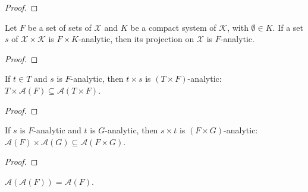 \begin{proof}\leanok

\end{proof}


\begin{lemma}\label{lem:IsPavingAnalytic.fst}
  \leanok
Let $F$ be a set of sets of $\mathcal{X}$ and $K$ be a compact system of $\mathcal{K}$, with $\emptyset \in K$.
If a set $s$ of $\mathcal{X} \times \mathcal{K}$ is $F \times K$-analytic, then its projection on $\mathcal{X}$ is $F$-analytic.
\end{lemma}

\begin{proof}\leanok

\end{proof}


\begin{lemma}\label{lem:IsPavingAnalytic.prod_left}
  \leanok
If $t \in T$ and $s$ is $F$-analytic, then $t \times s$ is $(T \times F)$-analytic: $T \times \mathcal{A}(F) \subseteq \mathcal{A}(T \times F)$.
\end{lemma}

\begin{proof}\leanok

\end{proof}


\begin{lemma}\label{lem:IsPavingAnalytic.prod}
  \leanok
If $s$ is $F$-analytic and $t$ is $G$-analytic, then $s \times t$ is $(F \times G)$-analytic: $\mathcal{A}(F) \times \mathcal{A}(G) \subseteq \mathcal{A}(F \times G)$.
\end{lemma}

\begin{proof}\leanok

\end{proof}


\begin{lemma}\label{lem:isPavingAnalytic_isPavingAnalytic}
  \leanok
$\mathcal{A}(\mathcal{A}(F)) = \mathcal{A}(F)$.
\end{lemma}

